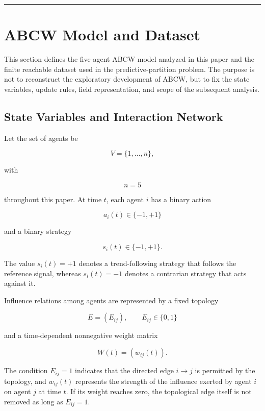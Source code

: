 \documentclass[
  11pt,
]{article}
\begin{document}
\begin{center}\rule{0.5\linewidth}{0.5pt}\end{center}

\section{ABCW Model and Dataset}\label{abcw-model-and-dataset}

This section defines the five-agent ABCW model analyzed in this paper
and the finite reachable dataset used in the predictive-partition
problem. The purpose is not to reconstruct the exploratory development
of ABCW, but to fix the state variables, update rules, field
representation, and scope of the subsequent analysis.

\hypertarget{state-variables-and-interaction-network}{%
\subsection{State Variables and Interaction
Network}\label{state-variables-and-interaction-network}}

Let the set of agents be

\[{V=\lbrace1,\ldots,n\rbrace,}\]

with

\[{n=5}\]

throughout this paper. At time \({t}\), each agent \({i}\) has a binary
action

\[{a_i(t)\in\lbrace-1,+1\rbrace}\]

and a binary strategy

\[{s_i(t)\in\lbrace-1,+1\rbrace.}\]

The value \({s_i(t)=+1}\) denotes a trend-following strategy that
follows the reference signal, whereas \({s_i(t)=-1}\) denotes a
contrarian strategy that acts against it.

Influence relations among agents are represented by a fixed topology

\[{E=(E_{ij}),\qquad E_{ij}\in\lbrace0,1\rbrace}\]

and a time-dependent nonnegative weight matrix

\[{W(t)=(w_{ij}(t)).}\]

The condition \({E_{ij}=1}\) indicates that the directed edge
\({i\to j}\) is permitted by the topology, and \({w_{ij}(t)}\)
represents the strength of the influence exerted by agent \({i}\) on
agent \({j}\) at time \({t}\). If its weight reaches zero, the
topological edge itself is not removed as long as \({E_{ij}=1}\).
\end{document}
